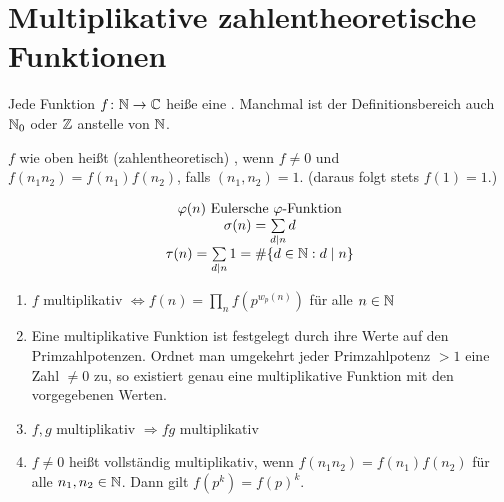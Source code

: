 \section{Multiplikative zahlentheoretische Funktionen}
\label{sec:para8}
	Jede Funktion $f \colon \mathbb{N} \rightarrow \mathbb{C}$ heiße eine . Manchmal ist der Definitionsbereich auch $\mathbb{N}_0$ oder $\mathbb{Z}$ anstelle von $\mathbb{N}$.

\begin{defn}	\label{def_8.1}
	$f$ wie oben heißt (zahlentheoretisch) , wenn $f \neq 0$ und $f(n_1n_2) = f(n_1)f(n_2)$, falls $(n_1,n_2) = 1$. (daraus folgt stets $f(1) = 1$.)
\end{defn}

	\[ \begin{array}{c}
	\varphi(n) \text{ Eulersche } \varphi\text{-Funktion} \\ 
	\sigma(n) = \sum\limits_{d \mid n} d \\ 
	\tau(n) = \sum\limits_{d \mid n} 1 = \#\{d \in \mathbb{N} : d \mid n\}
	\end{array} \]

	\begin{enumerate}[1)]
		\item $f$ multiplikativ $\Leftrightarrow f(n) = \prod\limits_{n} f(p^{w_p(n)})$ für alle $n \in \mathbb{N}$
		\item Eine multiplikative Funktion ist festgelegt durch ihre Werte auf den Primzahlpotenzen. Ordnet man umgekehrt jeder Primzahlpotenz $> 1$ eine Zahl $\neq 0$ zu, so existiert genau eine multiplikative Funktion mit den vorgegebenen Werten.
		\item $f, g$ multiplikativ $\Rightarrow fg$ multiplikativ
		\item $f \neq 0$ heißt vollständig multiplikativ, wenn $f(n_1n_2) = f(n_1)f(n_2)$ für alle $n_1, n_2 \in \mathbb{N}$. Dann gilt $f(p^k) = f(p)^k$.
	\end{enumerate}

\newpage